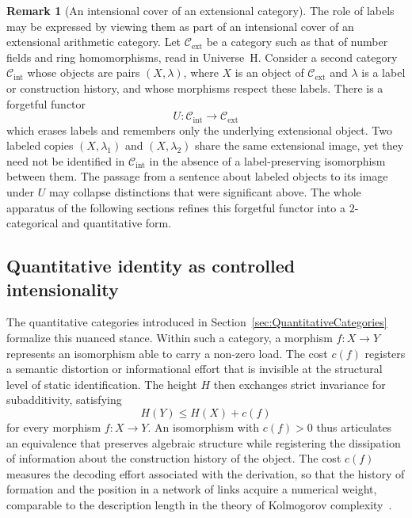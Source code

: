\documentclass[10pt, reqno]{amsart}
\theoremstyle{plain}
\theoremstyle{definition}
\newtheorem{remark}[theorem]{Remark}
\theoremstyle{plain}
\begin{document}
\begin{remark}[An intensional cover of an extensional category]\label{rem:IntensionalCover}
The role of labels may be expressed by viewing them as part of an intensional cover of an extensional arithmetic category. Let $\mathcal{C}_{\mathrm{ext}}$ be a category such as that of number fields and ring homomorphisms, read in Universe~H. Consider a second category $\mathcal{C}_{\mathrm{int}}$ whose objects are pairs $(X,\lambda)$, where $X$ is an object of $\mathcal{C}_{\mathrm{ext}}$ and $\lambda$ is a label or construction history, and whose morphisms respect these labels. There is a forgetful functor
\[
  U \colon \mathcal{C}_{\mathrm{int}} \longrightarrow \mathcal{C}_{\mathrm{ext}}
\]
which erases labels and remembers only the underlying extensional object. Two labeled copies $(X,\lambda_1)$ and $(X,\lambda_2)$ share the same extensional image, yet they need not be identified in $\mathcal{C}_{\mathrm{int}}$ in the absence of a label-preserving isomorphism between them. The passage from a sentence about labeled objects to its image under $U$ may collapse distinctions that were significant above. The whole apparatus of the following sections refines this forgetful functor into a $2$-categorical and quantitative form.
\end{remark}

\subsection{Quantitative identity as controlled intensionality}

The quantitative categories introduced in Section~\ref{sec:QuantitativeCategories} formalize this nuanced stance. Within such a category, a morphism $f \colon X \to Y$ represents an isomorphism able to carry a non-zero load. The cost $c(f)$ registers a semantic distortion or informational effort that is invisible at the structural level of static identification. The height $H$ then exchanges strict invariance for subadditivity, satisfying
\[
  H(Y) \leq H(X) + c(f)
\]
for every morphism $f \colon X \to Y$. An isomorphism with $c(f) > 0$ thus articulates an equivalence that preserves algebraic structure while registering the dissipation of information about the construction history of the object. The cost $c(f)$ measures the decoding effort associated with the derivation, so that the history of formation and the position in a network of links acquire a numerical weight, comparable to the description length in the theory of Kolmogorov complexity~\cite{Kolmogorov1965}.
\end{document}
